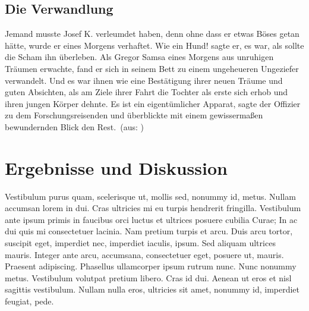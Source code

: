 \documentclass[paper=a4,fontsize=12pt,ngerman]{scrartcl}
\begin{document}
\subsection{Die Verwandlung}
\glqq Jemand musste Josef K. verleumdet haben, denn ohne dass er etwas Böses 
getan hätte, wurde er eines Morgens verhaftet. Wie ein Hund! sagte er, es 
war, als sollte die Scham ihn überleben. Als Gregor Samsa eines Morgens aus 
unruhigen Träumen erwachte, fand er sich in seinem Bett zu einem ungeheueren 
Ungeziefer verwandelt. Und es war ihnen wie eine Bestätigung ihrer neuen 
Träume und guten Absichten, als am Ziele ihrer Fahrt die Tochter als erste 
sich erhob und ihren jungen Körper dehnte. Es ist ein eigentümlicher Apparat, 
sagte der Offizier zu dem Forschungsreisenden und überblickte mit einem 
gewissermaßen bewundernden Blick den Rest.\grqq \ (aus: \cite{kaf12})

\section{Ergebnisse und Diskussion}
Vestibulum purus quam, scelerisque ut, mollis sed, nonummy id, metus. Nullam 
accumsan lorem in dui. Cras ultricies mi eu turpis hendrerit fringilla. 
Vestibulum ante ipsum primis in faucibus orci luctus et ultrices posuere 
cubilia Curae; In ac dui quis mi consectetuer lacinia. Nam pretium turpis et 
arcu. Duis arcu tortor, suscipit eget, imperdiet nec, imperdiet iaculis, 
ipsum. Sed aliquam ultrices mauris. Integer \cite{m85} ante arcu, accumsana, 
consectetuer eget, posuere ut, mauris. Praesent adipiscing. Phasellus 
ullamcorper ipsum rutrum nunc. Nunc nonummy metus. Vestibulum volutpat 
pretium libero. Cras id dui. Aenean ut eros et nisl sagittis vestibulum. 
Nullam nulla eros, ultricies sit amet, nonummy id, imperdiet feugiat, pede.
\end{document}
